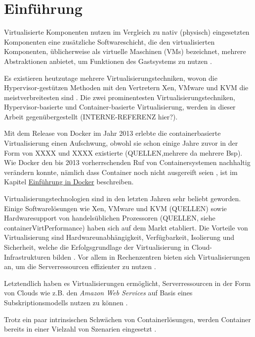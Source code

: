 \documentclass[../main.tex]{subfiles}
\begin{document}
\chapter{Einführung}
\label{intro}
  Virtualisierte Komponenten nutzen im Vergleich zu nativ (physisch) eingesetzten Komponenten eine zusätzliche Softwareschicht, die den virtualisierten Komponenten, üblicherweise als virtuelle Maschinen (VMs) bezeichnet, mehrere Abstraktionen anbietet, um Funktionen des Gastsystems zu nutzen \cite[S.2]{containerVirtPerformance}.

  Es existieren heutzutage mehrere Virtualisierungstechniken, wovon die Hypervisor-gestützen Methoden mit den Vertretern Xen, VMware und KVM die meistverbreitesten sind \cite[S.2]{containerVirtPerformance}. Die zwei prominentesten Virtualisierungstechniken, Hypervisor-basierte und Container-basierte Virtualisierung, werden in dieser Arbeit gegenübergestellt (INTERNE-REFERENZ hier?).

  Mit dem Release von Docker im Jahr 2013 erlebte die containerbasierte Virtualisierung einen Aufschwung, obwohl sie schon einige Jahre zuvor in der Form von XXXX und XXXX existierte (QUELLEN,mehrere da mehrere Bsp). Wie Docker den bis 2013 vorherrschenden Ruf von Containersystemen nachhaltig verändern konnte, nämlich dass Container noch nicht ausgereift seien \cite[S.8]{containerVirtPerformance}, ist im Kapitel \hyperref[dockerIntro]{\glqq{}Einführung in Docker\glqq{}} beschreiben.



  Virtualisierungstechnologien sind in den letzten Jahren sehr beliebt geworden. Einige Softwarelösungen wie Xen, VMware und KVM (QUELLEN) sowie Hardwaresupport von handelsüblichen Prozessoren (QUELLEN, siehe containerVirtPerformance) haben sich auf dem Markt etabliert.
  Die Vorteile von Virtualisierung sind Hardwareunabhängigkeit, Verfügbarkeit, Isolierung und Sicherheit, welche die Erfolgsgrundlage der Virtualisierung in Cloud-Infrastrukturen bilden \cite[S.1]{containerVirtPerformance}. Vor allem in Rechenzentren bieten sich Virtualisierungen an, um die Serverressourcen effizienter zu nutzen \cite[S.1]{dockerSec1}.

  Letztendlich haben es Virtualisierungen ermöglicht, Serverressourcen in der Form von \glspl{Cloud} wie z.B. den \emph{Amazon Web Services} auf Basis eines Subskriptionsmodells nutzen zu können \cite{amazonWebServices}\cite[S.1]{dockerSec1}.

  Trotz ein paar intrinsischen Schwächen von Containerlösungen, werden Container bereits in einer Vielzahl von Szenarien eingesetzt \cite[S.6]{dockerBook}.
\end{document}
